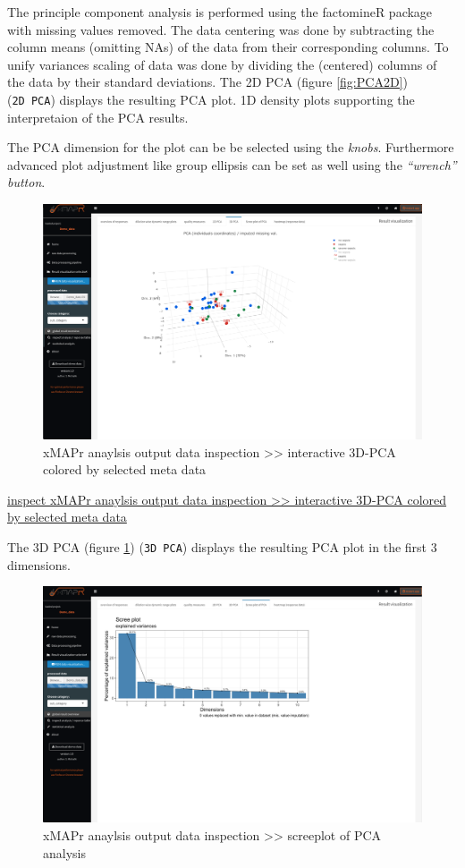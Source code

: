 \documentclass[
]{book}
\begin{document}
The principle component analysis is performed using the factomineR package with missing values removed. The data centering was done by subtracting the column means (omitting NAs) of the data from their corresponding columns. To unify variances scaling of data was done by dividing the (centered) columns of the data by their standard deviations. The 2D PCA (figure \ref{fig:PCA2D}) (\texttt{2D\ PCA}) displays the resulting PCA plot. 1D density plots supporting the interpretaion of the PCA results.

The PCA dimension for the plot can be be selected using the \emph{knobs}. Furthermore advanced plot adjustment like group ellipsis can be set as well using the \emph{``wrench'' button}.

\begin{figure}
\includegraphics[width=50.5in]{figures/global_result_overview_PCA3D} \caption{xMAPr anaylsis output data inspection >> interactive 3D-PCA colored by selected meta data}\label{fig:PCA3D}
\end{figure}

\href{figures/global_result_overview_PCA3D.png}{inspect xMAPr anaylsis output data inspection \textgreater\textgreater{} interactive 3D-PCA colored by selected meta data}

The 3D PCA (figure \ref{fig:PCA3D}) (\texttt{3D\ PCA}) displays the resulting PCA plot in the first 3 dimensions.

\begin{figure}
\includegraphics[width=50.5in]{figures/global_result_overview_PCA_scree} \caption{xMAPr anaylsis output data inspection >> screeplot of PCA analysis}\label{fig:PCAscreeplot}
\end{figure}
\end{document}
